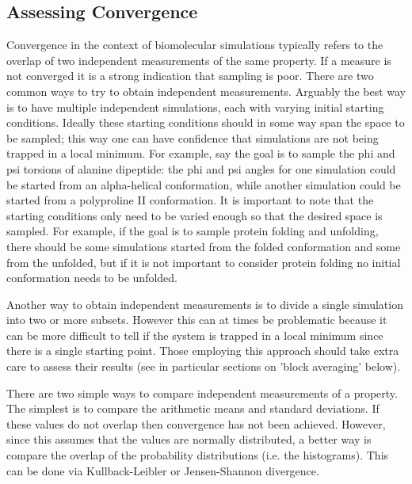 \subsection{Assessing Convergence}
Convergence in the context of biomolecular simulations typically refers to the overlap of two independent measurements of the same property. If a measure is not converged it is a strong indication that sampling is poor. There are two common ways to try to obtain independent measurements. Arguably the best way is to have multiple independent simulations, each with varying initial starting conditions. Ideally these starting conditions should in some way span the space to be sampled; this way one can have confidence that simulations are not being trapped in a local minimum. For example, say the goal is to sample the phi and psi torsions of alanine dipeptide: the phi and psi angles for one simulation could be started from an alpha-helical conformation, while another simulation could be started from a polyproline II conformation. It is important to note that the starting conditions only need to be varied enough so that the desired space is sampled. For example, if the goal is to sample protein folding and unfolding, there should be some simulations started from the folded conformation and some from the unfolded, but if it is not important to consider protein folding no initial conformation needs to be unfolded.

Another way to obtain independent measurements is to divide a single simulation into two or more subsets. However this can at times be problematic because it can be more difficult to tell if the system is trapped in a local minimum since there is a single starting point. Those employing this approach should take extra care to assess their results (see in particular sections on 'block averaging' below).

There are two simple ways to compare independent measurements of a property. The simplest is to compare the arithmetic means and standard deviations. If these values do not overlap then convergence has not been achieved. However, since this assumes that the values are normally distributed, a better way is compare the overlap of the probability distributions (i.e. the histograms). This can be done via Kullback-Leibler or Jensen-Shannon divergence.